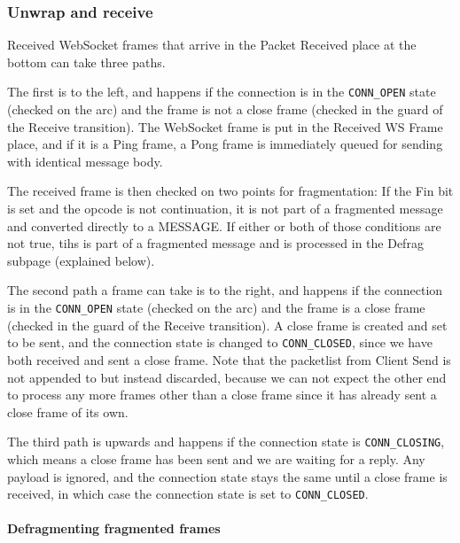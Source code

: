 	\subsubsection{Unwrap and receive}
		
		
		Received WebSocket frames that arrive in the Packet Received place at the
		bottom can take three paths. 
		
		The first is to the left, and happens if the
		connection is in the \lstinline:CONN_OPEN: state (checked on the arc) and the
		frame is not a close frame (checked in the guard of the Receive transition). The WebSocket
		frame is put in the Received WS Frame place, and if it is a Ping frame, a Pong
		frame is immediately queued for sending with identical message body. 
		
		The received frame is then checked on two points for fragmentation: If the Fin
		bit is set and the opcode is not continuation, it is not part of a fragmented
		message and converted directly to a MESSAGE. If either or both of those
		conditions are not true, tihs is part of a fragmented message and is processed
		in the Defrag subpage (explained below).
		
		The second path a frame can take is to the right, and happens if the
		connection is in the \lstinline:CONN_OPEN: state (checked on the arc) and the
		frame is a close frame (checked in the guard of the Receive transition). A
		close frame is created and set to be sent, and the
		connection state is changed to \lstinline:CONN_CLOSED:, since we have both
		received and sent a close frame. Note that the packetlist from Client Send is
		not appended to but instead discarded, because we can not expect the other
		end to process any more frames other than a close frame since it has already
		sent a close frame of its own.
		
		The third path is upwards and happens if the connection state is
		\lstinline:CONN_CLOSING:, which means a close frame has been sent and we are
		waiting for a reply. Any payload is ignored, and the connection state stays
		the same until a close frame is received, in which case the connection state
		is set to \lstinline:CONN_CLOSED:. 
		
		\paragraph{Defragmenting fragmented frames}
			
